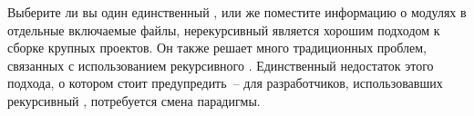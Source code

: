 Выберите ли вы один единственный \Makefile{}, или же поместите информацию
о модулях в отдельные включаемые файлы, нерекурсивный \GNUmake{}
является хорошим подходом к сборке крупных проектов. Он также решает
много традиционных проблем, связанных с использованием рекурсивного
\GNUmake{}. Единственный недостаток этого подхода, о котором стоит
предупредить~-- для разработчиков, использовавших рекурсивный
\GNUmake{}, потребуется смена парадигмы.
